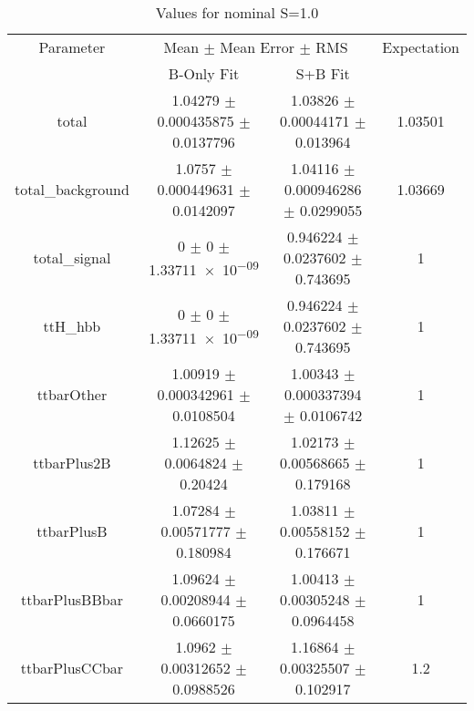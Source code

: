 \begin{table}
\centering
\caption{Values for nominal S=1.0}
\begin{tabular}{cccc}
\toprule
Parameter & \multicolumn{2}{c}{Mean $\pm$ Mean Error $\pm$ RMS} & Expectation\\
 & B-Only Fit & S+B Fit & \\
\midrule
total & \num{1.04279} $\pm$ \num{0.000435875} $\pm$ \num{0.0137796} & \num{1.03826} $\pm$ \num{0.00044171} $\pm$ \num{0.013964} & \num{1.03501}\\
total\_background & \num{1.0757} $\pm$ \num{0.000449631} $\pm$ \num{0.0142097} & \num{1.04116} $\pm$ \num{0.000946286} $\pm$ \num{0.0299055} & \num{1.03669}\\
total\_signal & \num{0} $\pm$ \num{0} $\pm$ \num{1.33711e-09} & \num{0.946224} $\pm$ \num{0.0237602} $\pm$ \num{0.743695} & \num{1}\\
ttH\_hbb & \num{0} $\pm$ \num{0} $\pm$ \num{1.33711e-09} & \num{0.946224} $\pm$ \num{0.0237602} $\pm$ \num{0.743695} & \num{1}\\
ttbarOther & \num{1.00919} $\pm$ \num{0.000342961} $\pm$ \num{0.0108504} & \num{1.00343} $\pm$ \num{0.000337394} $\pm$ \num{0.0106742} & \num{1}\\
ttbarPlus2B & \num{1.12625} $\pm$ \num{0.0064824} $\pm$ \num{0.20424} & \num{1.02173} $\pm$ \num{0.00568665} $\pm$ \num{0.179168} & \num{1}\\
ttbarPlusB & \num{1.07284} $\pm$ \num{0.00571777} $\pm$ \num{0.180984} & \num{1.03811} $\pm$ \num{0.00558152} $\pm$ \num{0.176671} & \num{1}\\
ttbarPlusBBbar & \num{1.09624} $\pm$ \num{0.00208944} $\pm$ \num{0.0660175} & \num{1.00413} $\pm$ \num{0.00305248} $\pm$ \num{0.0964458} & \num{1}\\
ttbarPlusCCbar & \num{1.0962} $\pm$ \num{0.00312652} $\pm$ \num{0.0988526} & \num{1.16864} $\pm$ \num{0.00325507} $\pm$ \num{0.102917} & \num{1.2}\\
\bottomrule
\end{tabular}
\end{table}